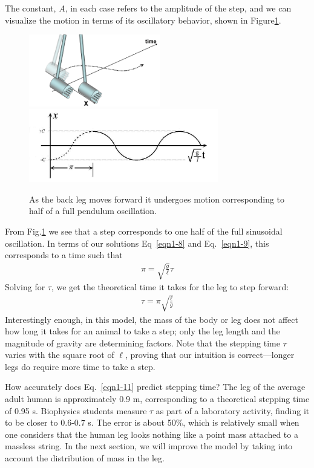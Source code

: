 The constant, $A$, in each case refers to the amplitude of the step, and we can visualize the motion in terms of its oscillatory behavior, shown in Figure\ref{Fig1-5}.
\begin{figure}[htb]
	\centering
	\includegraphics[width=2.25in]{./figures/Topic1/Figure1-5a.png}
	\includegraphics[width=3.25in]{./figures/Topic1/Figure1-5b.png}
	\caption{As the back leg moves forward it undergoes motion corresponding to half of a full pendulum oscillation.}
	\label{Fig1-5}
\end{figure}
From Fig.\ref{Fig1-5} we see that a step corresponds to one half of the full sinusoidal oscillation. In terms of our solutions Eq~\ref{eqn1-8} and Eq.~\ref{eqn1-9}, this corresponds to a time such that 
\begin{eqnarray}\label{eqn1-10}
\pi = \sqrt{\frac{g}{\ell}}\tau
\end{eqnarray}
Solving for $\tau$, we get the theoretical time it takes for the leg to step forward:
\begin{eqnarray}\label{eqn1-11}
\tau = \pi\sqrt{\frac{\ell}{g}}
\end{eqnarray}
Interestingly enough, in this model, the mass of the body or leg does not affect how long it takes for an animal to take a step; only the leg length and the magnitude of gravity are determining factors.  Note that the stepping time $\tau$ varies with the square root of $\ell$, proving that our intuition is correct—longer legs do require more time to take a step.

How accurately does Eq.~\ref{eqn1-11} predict stepping time?  The leg of the average adult human is approximately 0.9 m, corresponding to a theoretical stepping time of 0.95 s.  Biophysics students measure $\tau$ as part of a laboratory activity, finding it to be closer to 0.6-0.7 s.  The error is about 50\%, which is relatively small when one considers that the human leg looks nothing like a point mass attached to a massless string.  In the next section, we will improve the model by taking into account the distribution of mass in the leg.  

